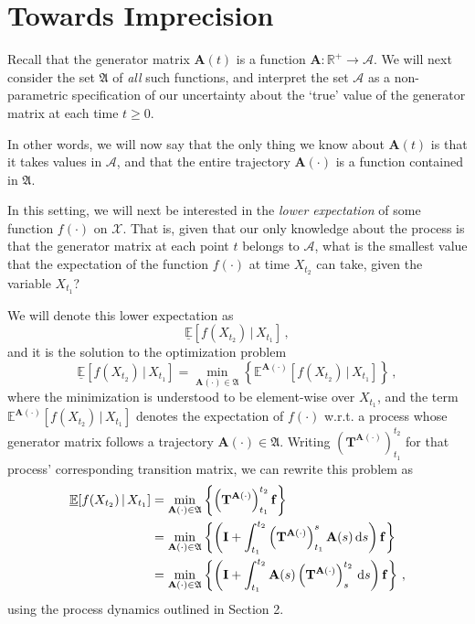 \documentclass[10pt]{article}
\newcommand{\dx}[1][x]{\text{\,d}#1}
\begin{document}
\section{Towards Imprecision}

Recall that the generator matrix $\mathbf{A}(t)$ is a function $\mathbf{A}: \mathbb{R}^+ \rightarrow \mathcal{A}$. We will next consider the set $\mathfrak{A}$ of \emph{all} such functions, and interpret the set $\mathcal{A}$ as a non-parametric specification of our uncertainty about the `true' value of the generator matrix at each time $t\geq 0$.

In other words, we will now say that the only thing we know about $\mathbf{A}(t)$ is that it takes values in $\mathcal{A}$, and that the entire trajectory $\mathbf{A}(\cdot)$ is a function contained in $\mathfrak{A}$.

In this setting, we will next be interested in the \emph{lower expectation} of some function $f(\cdot)$ on $\mathcal{X}$. That is, given that our only knowledge about the process is that the generator matrix at each point $t$ belongs to $\mathcal{A}$, what is the smallest value that the expectation of the function $f(\cdot)$ at time $X_{t_2}$ can take, given the variable $X_{t_1}$?

We will denote this lower expectation as
\begin{equation*}
\underline{\mathbb{E}}[f(X_{t_2})\,\vert\,X_{t_1}]\,,
\end{equation*}
and it is the solution to the optimization problem
\begin{equation*}
\underline{\mathbb{E}}[f(X_{t_2})\,\vert\,X_{t_1}] = \min_{\mathbf{A}(\cdot)\in\mathfrak{A}}\left\{\mathbb{E}^{\mathbf{A}(\cdot)}[f(X_{t_2})\,\vert\,X_{t_1}]\right\}\,,
\end{equation*}
where the minimization is understood to be element-wise over $X_{t_1}$, and the term $\mathbb{E}^{\mathbf{A}(\cdot)}[f(X_{t_2})\,\vert\,X_{t_1}]$ denotes the expectation of $f(\cdot)$ w.r.t. a process whose generator matrix follows a trajectory $\mathbf{A}(\cdot)\in\mathfrak{A}$. Writing $\left(\mathbf{T}^{\mathbf{A}(\cdot)}\right)_{t_1}^{t_2}$ for that process' corresponding transition matrix, we can rewrite this problem as
\begin{align*}
\underline{\mathbb{E}}[f(X_{t_2})\,\vert\,X_{t_1}] &= \min_{\mathbf{A}(\cdot)\in\mathfrak{A}}\left\{\left(\mathbf{T}^{\mathbf{A}(\cdot)}\right)_{t_1}^{t_2}\mathbf{f}\right\}\\
&= \min_{\mathbf{A}(\cdot)\in\mathfrak{A}}\left\{\left(\mathbf{I} + \int_{t_1}^{t_2}\left(\mathbf{T}^{\mathbf{A}(\cdot)}\right)_{t_1}^s\mathbf{A}(s)\dx[s]\right)\mathbf{f}\right\}\\
&= \min_{\mathbf{A}(\cdot)\in\mathfrak{A}}\left\{\left(\mathbf{I} + \int_{t_1}^{t_2}\mathbf{A}(s)\left(\mathbf{T}^{\mathbf{A}(\cdot)}\right)_{s}^{t_2}\dx[s]\right)\mathbf{f}\right\}\,,
\end{align*}
using the process dynamics outlined in Section 2. 
\end{document}
